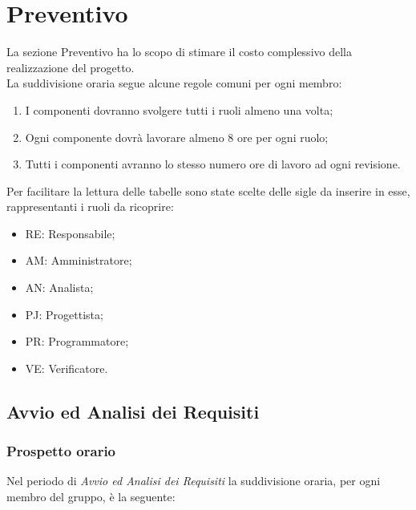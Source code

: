 \section{Preventivo}

La sezione Preventivo ha lo scopo di stimare il costo complessivo della realizzazione del progetto. \\ 
La suddivisione oraria segue alcune regole comuni per ogni membro:
\begin{enumerate}

	\item I componenti dovranno svolgere tutti i ruoli almeno una volta;
	\item Ogni componente dovrà lavorare almeno 8 ore per ogni ruolo;
	\item Tutti i componenti avranno lo stesso numero ore di lavoro ad ogni revisione.

\end{enumerate}
Per facilitare la lettura delle tabelle sono state scelte delle sigle da inserire in esse, rappresentanti i ruoli da ricoprire:
\begin{itemize}
	\item RE: Responsabile;
	\item AM: Amministratore;
	\item AN: Analista;
	\item PJ: Progettista;
	\item PR: Programmatore;
	\item VE: Verificatore.
\end{itemize}

\newpage
\subsection{Avvio ed Analisi dei Requisiti}
\subsubsection{Prospetto orario}

Nel periodo di \textit{Avvio ed Analisi dei Requisiti} la suddivisione oraria, per ogni membro del gruppo, è la seguente:

